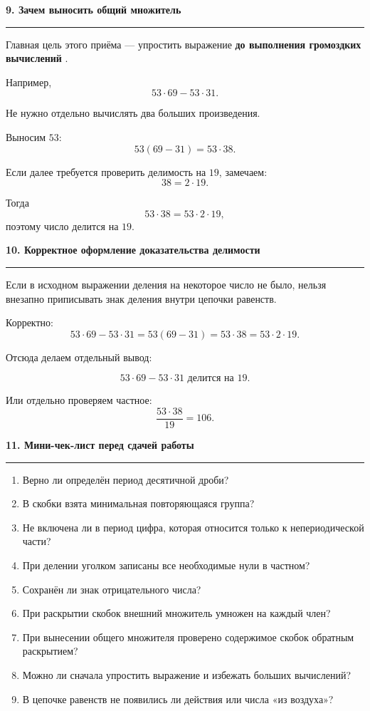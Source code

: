 \documentclass[a4paper,12pt]{article}
\newcommand{\sectiontitle}[1]{%
    \vspace{0.8em}
    {\Large\bfseries\textcolor{darkaccent}{#1}}\par
    \vspace{0.25em}
    \textcolor{accent}{\rule{\linewidth}{0.7pt}}
    \vspace{0.5em}
}
\newcommand{\important}[1]{%
    \textbf{\textcolor{darkaccent}{#1}}
}
\begin{document}
\sectiontitle{9. Зачем выносить общий множитель}

Главная цель этого приёма --- упростить выражение
\important{до выполнения громоздких вычислений}.

Например,
\[
53\cdot69-53\cdot31.
\]

Не нужно отдельно вычислять два больших произведения.

Выносим \(53\):
\[
53(69-31)=53\cdot38.
\]

Если далее требуется проверить делимость на \(19\), замечаем:
\[
38=2\cdot19.
\]

Тогда
\[
53\cdot38=53\cdot2\cdot19,
\]
поэтому число делится на \(19\).

\sectiontitle{10. Корректное оформление доказательства делимости}

Если в исходном выражении деления на некоторое число не было,
нельзя внезапно приписывать знак деления внутри цепочки равенств.

Корректно:
\[
53\cdot69-53\cdot31
=
53(69-31)
=
53\cdot38
=
53\cdot2\cdot19.
\]

Отсюда делаем отдельный вывод:

\[
\boxed{
53\cdot69-53\cdot31
\text{ делится на }19.
}
\]

Или отдельно проверяем частное:
\[
\frac{53\cdot38}{19}=106.
\]

\sectiontitle{11. Мини-чек-лист перед сдачей работы}

\begin{enumerate}[leftmargin=2em,itemsep=0.45em]
    \item Верно ли определён период десятичной дроби?
    \item В скобки взята минимальная повторяющаяся группа?
    \item Не включена ли в период цифра, которая относится только к непериодической части?
    \item При делении уголком записаны все необходимые нули в частном?
    \item Сохранён ли знак отрицательного числа?
    \item При раскрытии скобок внешний множитель умножен на каждый член?
    \item При вынесении общего множителя проверено содержимое скобок обратным раскрытием?
    \item Можно ли сначала упростить выражение и избежать больших вычислений?
    \item В цепочке равенств не появились ли действия или числа «из воздуха»?
\end{enumerate}
\end{document}
